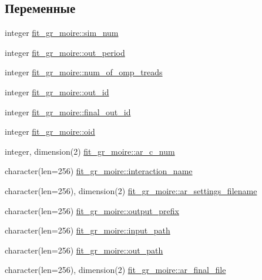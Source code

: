 \subsection*{Переменные}
\begin{DoxyCompactItemize}
\item 
integer \mbox{\hyperlink{namespacefit__gr__moire_aace6796e23a47584768373466a2a7522}{fit\+\_\+gr\+\_\+moire\+::sim\+\_\+num}}
\item 
integer \mbox{\hyperlink{namespacefit__gr__moire_a4a36513ac075c468e3f2c09114102f9b}{fit\+\_\+gr\+\_\+moire\+::out\+\_\+period}}
\item 
integer \mbox{\hyperlink{namespacefit__gr__moire_a6b6dcf709ac2f8f7908b7d38fe795dcc}{fit\+\_\+gr\+\_\+moire\+::num\+\_\+of\+\_\+omp\+\_\+treads}}
\item 
integer \mbox{\hyperlink{namespacefit__gr__moire_a877e34e1da1ed0d899e33ed675b1f0e5}{fit\+\_\+gr\+\_\+moire\+::out\+\_\+id}}
\item 
integer \mbox{\hyperlink{namespacefit__gr__moire_a29fb26687189e2457138123a8a823147}{fit\+\_\+gr\+\_\+moire\+::final\+\_\+out\+\_\+id}}
\item 
integer \mbox{\hyperlink{namespacefit__gr__moire_a813dce231711455b1086fcd6fd95c2a4}{fit\+\_\+gr\+\_\+moire\+::oid}}
\item 
integer, dimension(2) \mbox{\hyperlink{namespacefit__gr__moire_abc1d82be5a435c0c119ec1d686f6771c}{fit\+\_\+gr\+\_\+moire\+::ar\+\_\+c\+\_\+num}}
\item 
character(len=256) \mbox{\hyperlink{namespacefit__gr__moire_a7a35c12a582842134a9dac4018eddf7b}{fit\+\_\+gr\+\_\+moire\+::interaction\+\_\+name}}
\item 
character(len=256), dimension(2) \mbox{\hyperlink{namespacefit__gr__moire_abe61efd3e06474bc596014a35475150c}{fit\+\_\+gr\+\_\+moire\+::ar\+\_\+settings\+\_\+filename}}
\item 
character(len=256) \mbox{\hyperlink{namespacefit__gr__moire_ac107a23a93efd6c7247949001b635744}{fit\+\_\+gr\+\_\+moire\+::output\+\_\+prefix}}
\item 
character(len=256) \mbox{\hyperlink{namespacefit__gr__moire_a5f4eb40eb6a559f446c1097c651da540}{fit\+\_\+gr\+\_\+moire\+::input\+\_\+path}}
\item 
character(len=256) \mbox{\hyperlink{namespacefit__gr__moire_a77444985e23a0fc091f7623c2c4469b3}{fit\+\_\+gr\+\_\+moire\+::out\+\_\+path}}
\item 
character(len=256), dimension(2) \mbox{\hyperlink{namespacefit__gr__moire_a1e26c6ce1c81e9f34f2f2edd4fd40ae4}{fit\+\_\+gr\+\_\+moire\+::ar\+\_\+final\+\_\+file}}

\end{DoxyCompactItemize}
